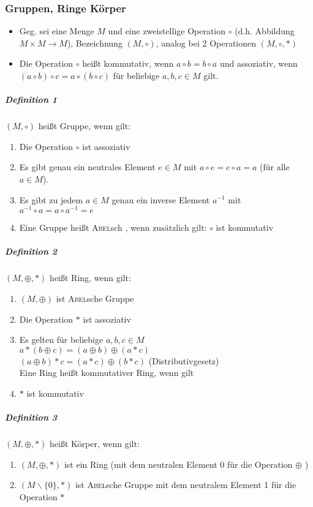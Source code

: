 \documentclass[a4paper]{scrartcl}
\begin{document}
\subsubsection{Gruppen, Ringe Körper}
\begin{itemize}
\item Geg. sei eine Menge $M$ und eine zweistellige Operation $\circ$ (d.h. Abbildung $M \times M \rightarrow M$),
Bezeichnung $(M,\circ)$, analog bei 2 Operationen $(M,\circ , *)$
\item Die Operation $\circ$ heißt kommutativ, wenn $a \circ b = b \circ a$ und assoziativ, wenn $(a\circ b)\circ c= a \circ (b \circ c)$ für beliebige $a,b,c \in M$ gilt.
\end{itemize}
\subparagraph{Definition 1} $(M,\circ)$ heißt Gruppe, wenn gilt:
\begin{enumerate}
\item Die Operation $\circ$ ist assoziativ
\item Es gibt genau ein neutrales Element $e \in M$ mit $a \circ e = e \circ a = a$ (für alle $a \in M$).
\item Es gibt zu jedem $a \in M$ genau ein inverse Element $a^{-1}$ mit $a^{-1} \circ a = a \circ a^{-1} = e$
\item Eine Gruppe heißt \textsc{Abel}sch , wenn zusätzlich gilt: $\circ$ ist kommutativ
\end{enumerate}

\subparagraph{Definition 2} $(M, \oplus , *)$ heißt Ring, wenn gilt:
\begin{enumerate}
\item $(M,\oplus)$ ist \textsc{Abel}sche Gruppe
\item Die Operation $*$ ist assoziativ
\item Es gelten für beliebige $a,b,c \in M$\\
$a*(b \oplus c) = (a \oplus b ) \oplus (a *c)$\\
$(a \oplus b ) * c = (a * c) \oplus (b*c)$ (Distributivgesetz)\\
Eine Ring heißt kommutativer Ring, wenn gilt
\item $*$ ist kommutativ
\end{enumerate}

\subparagraph{Definition 3} $(M, \oplus , *)$ heißt Körper, wenn gilt:
\begin{enumerate}
\item $(M, \oplus , *)$ ist ein Ring (mit dem neutralen Element 0 für die Operation $\oplus$ )
\item $(M\backslash \{0\}, *)$ ist \textsc{Abel}sche Gruppe mit dem neutralem Element 1 für die Operation $*$
\end{enumerate}
\end{document}
